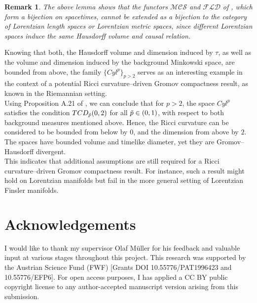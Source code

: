 \documentclass[11pt, a4paper]{article} %
\theoremstyle{plain} %
\newtheorem{remark}{Remark}
\begin{document}
\begin{remark}
        The above lemma shows that the functors $\mathcal{MCS}$ and $\mathcal{FLD}$ of \cite{M_ller_2023}, which form a bijection on spacetimes, cannot be extended as a bijection to the category of Lorentzian length spaces or Lorentzian metric spaces, since different Lorentzian spaces induce the same Hausdorff volume and causal relation.
\end{remark}
Knowing that both, the Hausdorff volume and dimension induced by $\tau$, as well as the volume and dimension induced by the background Minkowski space, are bounded from above, the family $\{Cyl^p\}_{p>2}$ serves as an interesting example in the context of a potential Ricci curvature–driven Gromov compactness result, as known in the Riemannian setting.\\
Using Proposition A.21 of \cite{beran2024nonlineardalembertcomparisontheorem}, we can conclude that for $p > 2$, the space $Cyl^p$ satisfies the condition $TCD_{\Tilde{p}}(0,2)$ for all $\Tilde{p} \in (0,1)$, with respect to both background measures mentioned above. Hence, the Ricci curvature can be considered to be bounded from below by $0$, and the dimension from above by $2$. The spaces have bounded volume and timelike diameter, yet they are Gromov–Hausdorff divergent.\\
This indicates that additional assumptions are still required for a Ricci curvature–driven Gromov compactness result. For instance, such a result might hold on Lorentzian manifolds but fail in the more general setting of Lorentzian Finsler manifolds.

\section{Acknowledgements}
I would like to thank my supervisor Olaf Müller for his feedback and valuable input
at various stages throughout this project. This research was supported by the Austrian Science Fund
(FWF) [Grants DOI 10.55776/PAT1996423 and 10.55776/EFP6]. For open access purposes,
I has applied a CC BY public copyright license to any author-accepted manuscript version arising from this submission.
\newpage


\end{document}
